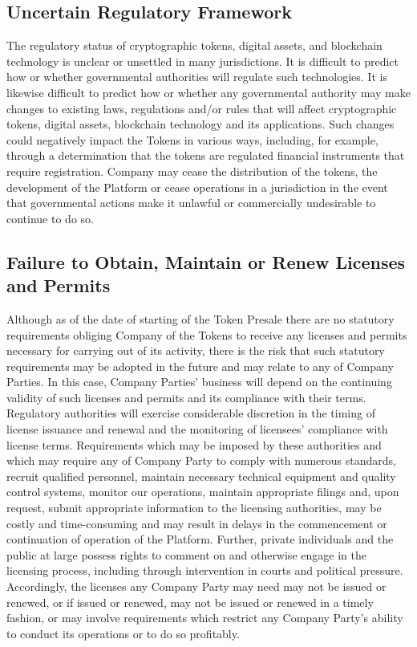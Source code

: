 \documentclass[12pt]{report}
\begin{document}
\begin{multicols}{2}
\subsection{Uncertain Regulatory Framework}
The regulatory status of cryptographic tokens, digital assets, and blockchain technology is unclear or unsettled in many jurisdictions. It is difficult to predict how or whether governmental authorities will regulate such technologies. It is likewise difficult to predict how or whether any governmental authority may make changes to existing laws, regulations and/or rules that will affect cryptographic tokens, digital assets, blockchain technology and its applications. Such changes could negatively impact the Tokens in various ways, including, for example, through a determination that the tokens are regulated financial instruments that require registration. Company may cease the distribution of the tokens, the development of the Platform or cease operations in a jurisdiction in the event that governmental actions make it unlawful or commercially undesirable to continue to do so.

\subsection{Failure to Obtain, Maintain or Renew Licenses and Permits}
Although as of the date of starting of the Token Presale there are no statutory requirements obliging Company of the Tokens to receive any licenses and permits necessary for carrying out of its activity, there is the risk that such statutory requirements may be adopted in the future and may relate to any of Company Parties. In this case, Company Parties’ business will depend on the continuing validity of such licenses and permits and its compliance with their terms. Regulatory authorities will exercise considerable discretion in the timing of license issuance and
renewal and the monitoring of licensees’ compliance with license terms. Requirements which may be imposed by these authorities and which may require any of Company Party to comply with numerous standards, recruit qualified personnel, maintain necessary technical equipment and quality control systems, monitor our operations, maintain appropriate filings and, upon request, submit appropriate information to the licensing authorities, may be costly and time-consuming and may result in delays in the commencement or continuation of operation of the
Platform. Further, private individuals and the public at large possess rights to comment on and otherwise engage in the licensing process, including through intervention in courts and political pressure. Accordingly, the licenses any
Company Party may need may not be issued or renewed, or if issued or renewed, may not be issued or renewed in a timely fashion, or may involve requirements which restrict any Company Party’s ability to conduct its operations or to do so profitably.


\end{multicols}
\end{document}
